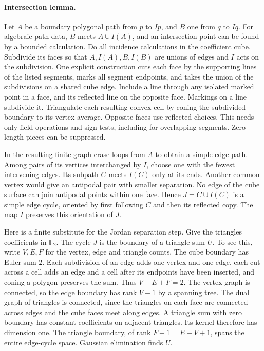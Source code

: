\documentclass[10pt,letterpaper]{article}
\begin{document}
\paragraph{Intersection lemma.}
Let $A$ be a boundary polygonal path from $p$ to $Ip$, and $B$ one
from $q$ to $Iq$. For algebraic path data, $B$ meets $A\cup I(A)$, and
an intersection point can be found by a bounded calculation.
Do all incidence calculations in the coefficient cube. Subdivide its
faces so that $A,I(A),B,I(B)$ are unions of edges and $I$ acts on the
subdivision. One explicit construction cuts each face by the supporting
lines of the listed segments, marks all segment endpoints, and takes
the union of the subdivisions on a shared cube edge. Include a line
through any isolated marked point in a face, and its reflected line
on the opposite face. Markings on a line subdivide it. Triangulate
each resulting convex cell by coning the subdivided boundary to its
vertex average. Opposite faces use reflected choices. This needs only
field operations and sign tests, including for overlapping segments.
Zero-length pieces can be suppressed.

In the resulting finite graph erase loops from $A$ to obtain a simple
edge path. Among pairs of its vertices interchanged by $I$, choose one
with the fewest intervening edges. Its subpath $C$ meets $I(C)$ only
at its ends. Another common vertex would give an antipodal pair with
smaller separation. No edge of the cube surface can join antipodal
points within one face. Hence $J=C\cup I(C)$ is a simple edge cycle,
oriented by first following $C$ and then its reflected copy. The map
$I$ preserves this orientation of $J$.

Here is a finite substitute for the Jordan separation step. Give the
triangles coefficients in $\mathbb F_2$. The cycle $J$ is the boundary
of a triangle sum $U$. To see this, write $V,E,F$ for the vertex, edge
and triangle counts. The cube boundary has Euler sum $2$. Each
subdivision of an edge adds one vertex and one edge, each cut across a
cell adds an edge and a cell after its endpoints have been inserted,
and coning a polygon preserves the sum. Thus $V-E+F=2$. The vertex
graph is connected, so the edge boundary has rank $V-1$ by a spanning
tree. The dual graph of triangles is connected, since the triangles
on each face are connected across edges and the cube faces meet along
edges. A triangle sum with zero boundary has constant coefficients
on adjacent triangles. Its kernel therefore has dimension one. The
triangle boundary, of rank $F-1=E-V+1$, spans the entire edge-cycle
space. Gaussian elimination finds $U$.
\end{document}
